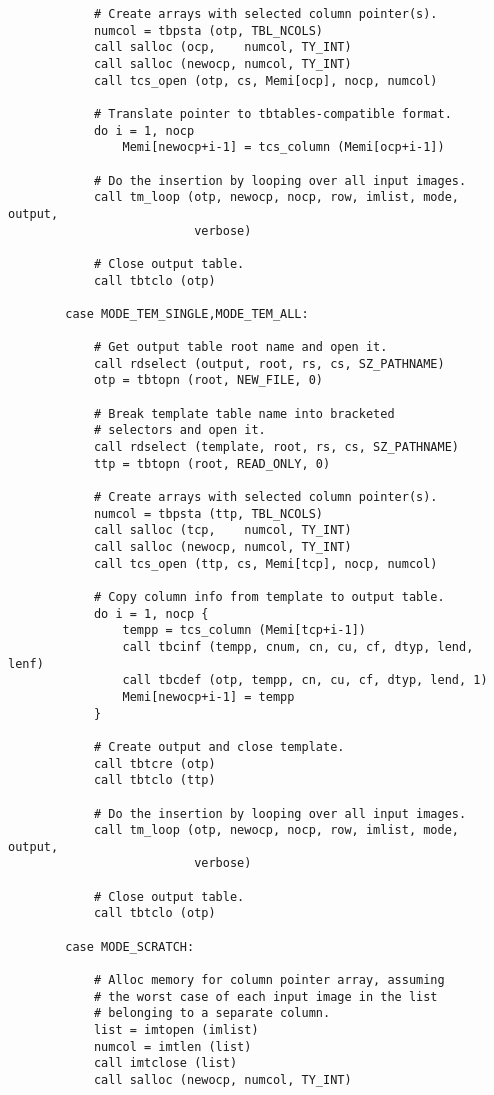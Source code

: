 \begin{verbatim}
            # Create arrays with selected column pointer(s).
            numcol = tbpsta (otp, TBL_NCOLS)
            call salloc (ocp,    numcol, TY_INT)
            call salloc (newocp, numcol, TY_INT)
            call tcs_open (otp, cs, Memi[ocp], nocp, numcol)

            # Translate pointer to tbtables-compatible format.
            do i = 1, nocp
                Memi[newocp+i-1] = tcs_column (Memi[ocp+i-1])

            # Do the insertion by looping over all input images.
            call tm_loop (otp, newocp, nocp, row, imlist, mode, output,
                          verbose)

            # Close output table.
            call tbtclo (otp)

        case MODE_TEM_SINGLE,MODE_TEM_ALL:

            # Get output table root name and open it.
            call rdselect (output, root, rs, cs, SZ_PATHNAME)
            otp = tbtopn (root, NEW_FILE, 0)

            # Break template table name into bracketed 
            # selectors and open it.
            call rdselect (template, root, rs, cs, SZ_PATHNAME)
            ttp = tbtopn (root, READ_ONLY, 0)

            # Create arrays with selected column pointer(s).
            numcol = tbpsta (ttp, TBL_NCOLS)
            call salloc (tcp,    numcol, TY_INT)
            call salloc (newocp, numcol, TY_INT)
            call tcs_open (ttp, cs, Memi[tcp], nocp, numcol)

            # Copy column info from template to output table.
            do i = 1, nocp {
                tempp = tcs_column (Memi[tcp+i-1])
                call tbcinf (tempp, cnum, cn, cu, cf, dtyp, lend, lenf)
                call tbcdef (otp, tempp, cn, cu, cf, dtyp, lend, 1)
                Memi[newocp+i-1] = tempp
            }

            # Create output and close template.
            call tbtcre (otp)
            call tbtclo (ttp)

            # Do the insertion by looping over all input images.
            call tm_loop (otp, newocp, nocp, row, imlist, mode, output,
                          verbose)

            # Close output table.
            call tbtclo (otp)

        case MODE_SCRATCH:

            # Alloc memory for column pointer array, assuming  
            # the worst case of each input image in the list 
            # belonging to a separate column.
            list = imtopen (imlist)
            numcol = imtlen (list)
            call imtclose (list)
            call salloc (newocp, numcol, TY_INT)


\end{verbatim}
